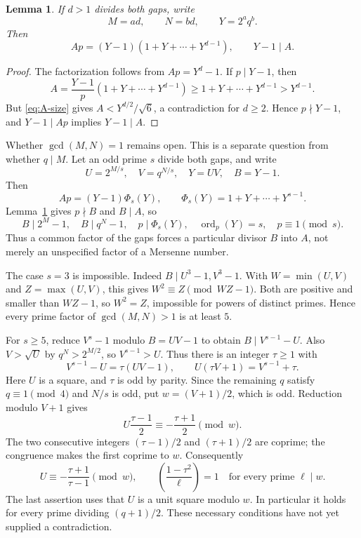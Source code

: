 \documentclass[11pt]{article}
\newtheorem{lemma}{Lemma}
\begin{document}
\begin{lemma}\label{lem:divisor}
If $d>1$ divides both gaps, write
\[
M=ad,\qquad N=bd,\qquad Y=2^aq^b.
\]
Then
\[
Ap=(Y-1)(1+Y+\cdots+Y^{d-1}),\qquad Y-1\mid A.
\]
\end{lemma}
\begin{proof}
The factorization follows from $Ap=Y^d-1$. If $p\mid Y-1$, then
\[
A=\frac{Y-1}{p}(1+Y+\cdots+Y^{d-1})
 \geq 1+Y+\cdots+Y^{d-1}>Y^{d-1}.
\]
But \eqref{eq:A-size} gives $A<Y^{d/2}/\sqrt6$, a contradiction
for $d\geq2$. Hence $p\nmid Y-1$, and $Y-1\mid Ap$ implies
$Y-1\mid A$.
\end{proof}

Whether $\gcd(M,N)=1$ remains open. This is a separate question from
whether $q\mid M$.
Let an odd prime $s$ divide both gaps, and write
\[
U=2^{M/s},\quad V=q^{N/s},\quad Y=UV,\quad B=Y-1.
\]
Then
\[
Ap=(Y-1)\Phi_s(Y),\qquad
\Phi_s(Y)=1+Y+\cdots+Y^{s-1}.
\]
Lemma~\ref{lem:divisor} gives $p\nmid B$ and $B\mid A$, so
\[
B\mid2^M-1,\quad B\mid q^N-1,\quad
p\mid\Phi_s(Y),\quad \operatorname{ord}_p(Y)=s,\quad p\equiv1\pmod s.
\]
Thus a common factor of the gaps forces a particular divisor $B$ into
$A$, not merely an unspecified factor of a Mersenne number.

The case $s=3$ is impossible. Indeed $B\mid U^3-1,V^3-1$.
With $W=\min(U,V)$ and $Z=\max(U,V)$, this gives
$W^2\equiv Z\pmod{WZ-1}$. Both are positive and smaller than $WZ-1$,
so $W^2=Z$, impossible for powers of distinct primes. Hence every prime
factor of $\gcd(M,N)>1$ is at least $5$.

For $s\geq5$, reduce $V^s-1$ modulo $B=UV-1$ to obtain
$B\mid V^{s-1}-U$. Also $V>\sqrt U$ by $q^N>2^{M/2}$,
so $V^{s-1}>U$. Thus there is an integer $\tau\geq1$ with
\[
V^{s-1}-U=\tau(UV-1),\qquad
U(\tau V+1)=V^{s-1}+\tau.
\]
Here $U$ is a square, and $\tau$ is odd by parity. Since the remaining
$q$ satisfy $q\equiv1\pmod4$ and $N/s$ is odd, put
$w=(V+1)/2$, which is odd. Reduction modulo $V+1$ gives
\[
U\frac{\tau-1}{2}\equiv-\frac{\tau+1}{2}\pmod w.
\]
The two consecutive integers $(\tau-1)/2$ and $(\tau+1)/2$ are coprime;
the congruence makes the first coprime to $w$. Consequently
\[
U\equiv-\frac{\tau+1}{\tau-1}\pmod w,
\qquad
\left(\frac{1-\tau^2}{\ell}\right)=1
\quad\text{for every prime }\ell\mid w.
\]
The last assertion uses that $U$ is a unit square modulo $w$.
In particular it holds for every prime dividing $(q+1)/2$.
These necessary conditions have not yet supplied a contradiction.
\end{document}
